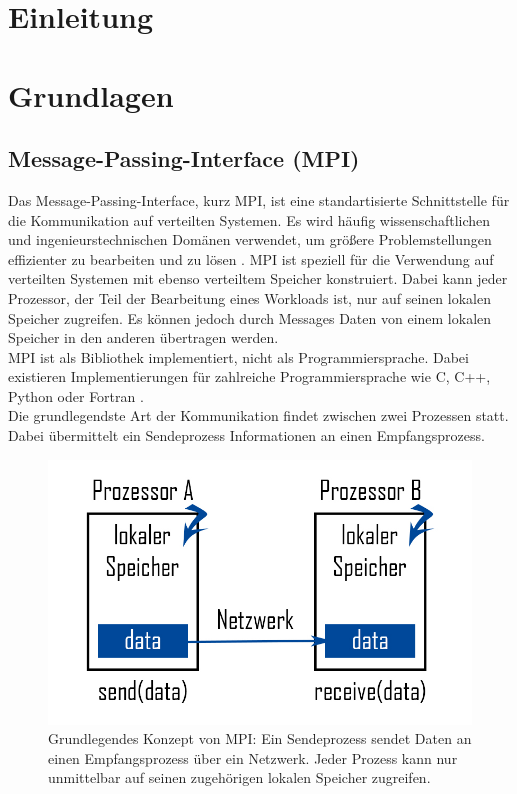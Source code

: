 \documentclass[doktyp=semarbeit, sprache=german]{TUBAFarbeiten}
\begin{document}
\maketitle
\tableofcontents
\TUBAFErklaerungsseite
\newpage
\section{Einleitung}
\section{Grundlagen}
\subsection{Message-Passing-Interface (MPI)}
Das Message-Passing-Interface, kurz MPI, ist eine standartisierte Schnittstelle für die Kommunikation auf verteilten Systemen. Es wird häufig wissenschaftlichen und ingenieurstechnischen Domänen verwendet, um größere Problemstellungen effizienter zu bearbeiten und zu lösen \cite{MPIBook}. MPI ist speziell für die Verwendung auf verteilten Systemen mit ebenso verteiltem Speicher konstruiert. Dabei kann jeder Prozessor, der Teil der Bearbeitung eines Workloads ist, nur auf seinen lokalen Speicher zugreifen. Es können jedoch durch Messages Daten von einem lokalen Speicher in den anderen übertragen werden.
\\MPI ist als Bibliothek implementiert, nicht als Programmiersprache. Dabei existieren Implementierungen für zahlreiche Programmiersprache wie C, C++, Python oder Fortran \cite{ScriptPC}.
\\Die grundlegendste Art der Kommunikation findet zwischen zwei Prozessen statt. Dabei übermittelt ein Sendeprozess Informationen an einen Empfangsprozess.
\begin{figure}
	\centering
	\captionsetup{justification=centering} 
	\includegraphics[width=1.0\textwidth]{images/MPIModell.jpg}
	\caption{Grundlegendes Konzept von MPI: Ein Sendeprozess sendet Daten an einen Empfangsprozess über ein Netzwerk. Jeder Prozess kann nur unmittelbar auf seinen zugehörigen lokalen Speicher zugreifen.}
	\label{img:mpimodell}
\end{figure}
\end{document}
